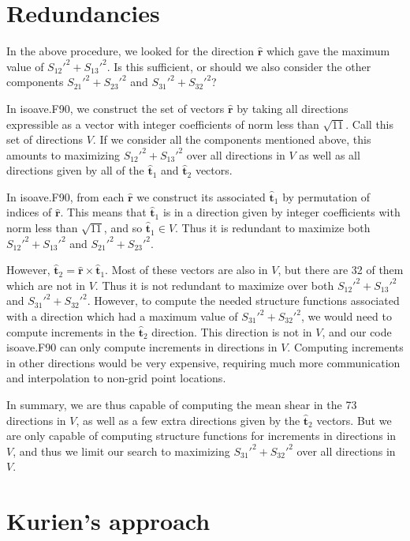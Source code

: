 \documentclass[12pt]{article}
\begin{document}
\section*{Redundancies}

In the above procedure, we looked for the direction $ \bm{{\hat r}}$
which gave the maximum value of $S_{12}'^2 + S_{13}'^2$.  
Is this sufficient, or should we also consider the other
components $S_{21}'^2 + S_{23}'^2$ and 
$S_{31}'^2 + S_{32}'^2$?  

In isoave.F90, we construct the set of vectors $\bm{{\hat r}}$ 
by taking all directions expressible as a vector with integer
coefficients of norm less than $\sqrt{11}$. Call this set
of directions $V$.   If we consider all the components mentioned
above, this amounts to maximizing $S_{12}'^2 + S_{13}'^2$ over
all directions in $V$ as well as all directions given by
all of the $\bm{{\hat t}}_1$ and $\bm{{\hat t}}_2$ vectors.

In isoave.F90, from each $\bm{{\hat r}}$ we construct its associated
$\bm{{\hat t}}_1$ by permutation of indices of $\bm{{\hat r}}$.
This means that $\bm{{\hat t}}_1$ is in a direction given by integer coefficients
with norm less than $\sqrt{11}$, and so $\bm{{\hat t}}_1 \in V$.  
Thus it is redundant to maximize
both $S_{12}'^2 + S_{13}'^2$ and $S_{21}'^2 + S_{23}'^2$.

However, $\bm{{\hat t}}_2 = \bm{{\hat r}} \times \bm{{\hat t}}_1$.
Most of these vectors are also in $V$, but there are 32 of them 
which are not in $V$.  Thus it is not redundant to maximize over
both $S_{12}'^2 + S_{13}'^2$ and $S_{31}'^2 + S_{32}'^2$.
However, to compute the needed structure functions associated with
a direction which had a maximum value of $S_{31}'^2 + S_{32}'^2$, we
would need to compute increments in the $\bm{{\hat t}}_2$ direction.
This direction is not in $V$, and our code isoave.F90 can only 
compute increments in directions in $V$.  Computing increments in
other directions would be very expensive, requiring much more communication
and interpolation to non-grid point locations.

In summary, we are thus capable of computing the mean shear in
the 73 directions in $V$, as well as a few extra directions given by the
$\bm{{\hat t}}_2$ vectors.   But we are only capable of computing
structure functions for increments in directions in $V$, and thus
we limit our search to maximizing $S_{31}'^2 + S_{32}'^2$ over
all directions in $V$.  


\section*{Kurien's approach}
\end{document}

